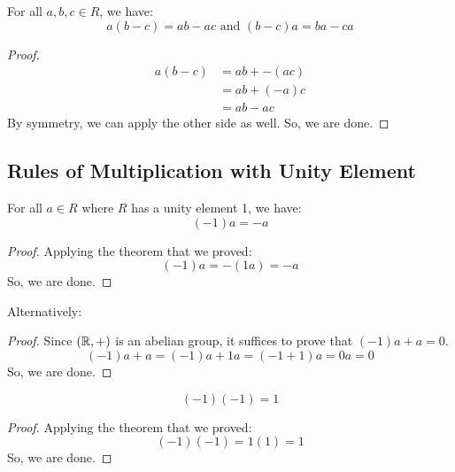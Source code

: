 \documentclass[letterpaper]{article}
\begin{document}
\begin{theorem}{}{}
    For all $a, b, c \in R$, we have: 
    \[a(b - c) = ab - ac \text{ and } (b - c)a = ba - ca\]
\end{theorem}

\begin{mdframed}[]
    \begin{proof}
        \begin{equation*}
            \begin{aligned}
                a(b - c) &= ab + -(ac) \\ 
                    &= ab + (-a)c \\ 
                    &= ab - ac
            \end{aligned}
        \end{equation*}
        By symmetry, we can apply the other side as well. So, we are done. 
    \end{proof}
\end{mdframed}

\subsection{Rules of Multiplication with Unity Element}
\begin{theorem}{}{}
    For all $a \in R$ where $R$ has a unity element 1, we have: 
    \[(-1)a = -a\]
\end{theorem}

\begin{mdframed}[]
    \begin{proof}
        Applying the theorem that we proved:
        \[(-1)a = -(1a) = -a\]
        So, we are done. 
    \end{proof}
\end{mdframed}

Alternatively:
\begin{mdframed}[]
    \begin{proof}
        Since $(\mathbb{R}, +)$ is an abelian group, it suffices to prove that $(-1)a + a = 0$.
        \[(-1)a + a = (-1)a + 1a = (-1 + 1)a = 0a = 0\]
        So, we are done. 
    \end{proof}
\end{mdframed}

\begin{theorem}{}{}
    \[(-1)(-1) = 1\]
\end{theorem}

\begin{mdframed}[]
    \begin{proof}
        Applying the theorem that we proved:
        \[(-1)(-1) = 1(1) = 1\]
        So, we are done.
    \end{proof}
\end{mdframed}
\end{document}
